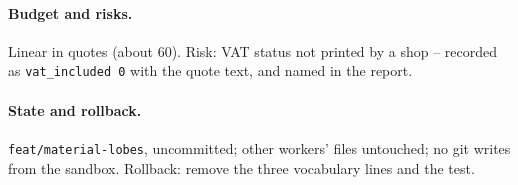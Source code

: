 \documentclass[11pt,a4paper]{article}
\begin{document}
\paragraph{Budget and risks.} Linear in quotes (about 60). Risk: VAT status not printed by a shop --
recorded as \texttt{vat\_included 0} with the quote text, and named in the report.
\paragraph{State and rollback.} \texttt{feat/material-lobes}, uncommitted; other workers' files
untouched; no git writes from the sandbox. Rollback: remove the three vocabulary lines and the test.
\begin{center}\end{center}
\end{document}
